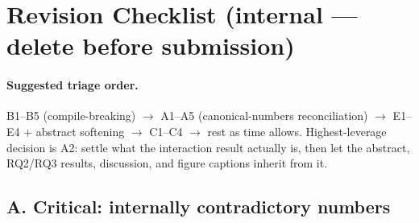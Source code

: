 %

\newcommand{\citem}[2]{\item[$\square$] \textbf{#1.} #2}
\newcommand{\cdone}[2]{\item[\textcolor{green!55!black}{\rlap{\kern0.25ex\raisebox{0.15ex}{\checkmark}}$\square$}] \textbf{#1.} \textcolor{gray}{#2}}
\newcommand{\crej}[2]{\item[\textcolor{red!70!black}{$\boxtimes$}] \textbf{#1.} \sout{#2}}

\clearpage
\begingroup
\color{red}   %
\section*{Revision Checklist (internal --- delete before submission)}

\paragraph{Suggested triage order.} B1--B5 (compile-breaking) $\rightarrow$
A1--A5 (canonical-numbers reconciliation) $\rightarrow$ E1--E4 + abstract
softening $\rightarrow$ C1--C4 $\rightarrow$ rest as time allows. Highest-leverage
decision is A2: settle what the interaction result actually is, then let the
abstract, RQ2/RQ3 results, discussion, and figure captions inherit from it.

\subsection*{A. Critical: internally contradictory numbers}

